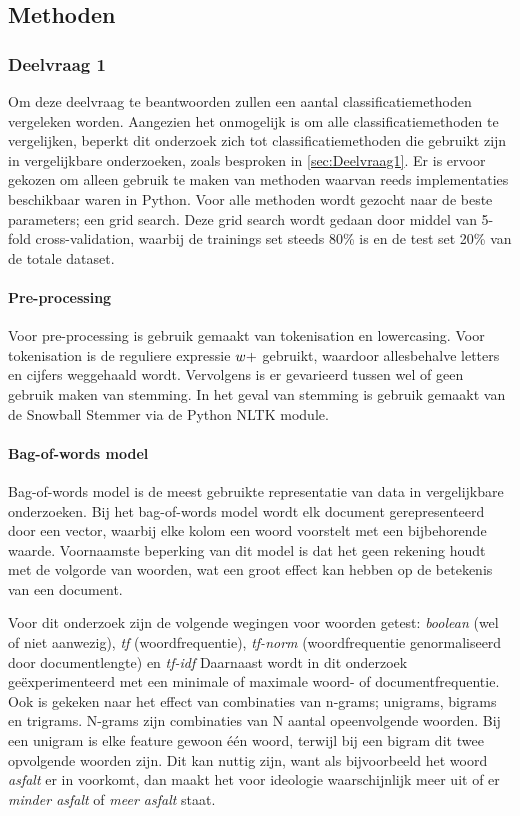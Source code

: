 \subsection{Methoden}


\subsubsection{Deelvraag 1}
Om deze deelvraag te beantwoorden zullen een aantal classificatiemethoden vergeleken worden. Aangezien het onmogelijk is om alle classificatiemethoden te vergelijken, beperkt dit onderzoek zich tot classificatiemethoden die gebruikt zijn in vergelijkbare onderzoeken, zoals besproken in \ref{sec:Deelvraag1}. Er is ervoor gekozen om alleen gebruik te maken van methoden waarvan reeds implementaties beschikbaar waren in Python. Voor alle methoden wordt gezocht naar de beste parameters; een grid search. Deze grid search wordt gedaan door middel van 5-fold cross-validation, waarbij de trainings set steeds 80\% is en de test set 20\% van de totale dataset.

\paragraph{Pre-processing}
Voor pre-processing is gebruik gemaakt van tokenisation en lowercasing. Voor tokenisation is de reguliere expressie $\\w+$ gebruikt, waardoor allesbehalve letters en cijfers weggehaald wordt. Vervolgens is er gevarieerd tussen wel of geen gebruik maken van stemming. In het geval van stemming is gebruik gemaakt van de Snowball Stemmer via de Python NLTK module.

\paragraph{Bag-of-words model}
Bag-of-words model is de meest gebruikte representatie van data in vergelijkbare onderzoeken. Bij het bag-of-words model wordt elk document gerepresenteerd door een vector, waarbij elke kolom een woord voorstelt met een bijbehorende waarde. Voornaamste beperking van dit model is dat het geen rekening houdt met de volgorde van woorden, wat een groot effect kan hebben op de betekenis van een document.\par
Voor dit onderzoek zijn de volgende wegingen voor woorden getest: \textit{boolean} (wel of niet aanwezig), \textit{tf} (woordfrequentie), \textit{tf-norm} (woordfrequentie genormaliseerd door documentlengte) en \textit{tf-idf}
Daarnaast wordt in dit onderzoek geëxperimenteerd met een minimale of maximale woord- of documentfrequentie. Ook is gekeken naar het effect van combinaties van n-grams; unigrams, bigrams en trigrams. N-grams zijn combinaties van N aantal opeenvolgende woorden. Bij een unigram is elke feature gewoon één woord, terwijl bij een bigram dit twee opvolgende woorden zijn. Dit kan nuttig zijn, want als bijvoorbeeld het woord \textit{asfalt} er in voorkomt, dan maakt het voor ideologie waarschijnlijk meer uit of er \textit{minder asfalt} of \textit{meer asfalt} staat.\par

